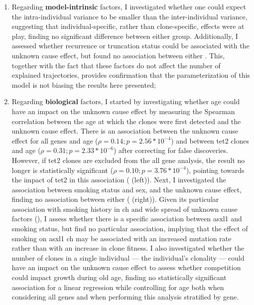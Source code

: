 \begin{enumerate}
    \item Regarding \textbf{model-intrinsic} factors, I investigated whether one could expect the intra-individual variance to be smaller than the inter-individual variance, suggesting that individual-specific, rather than clone-specific, effects were at play, finding no significant difference between either group. Additionally, I assessed whether recurrence or truncation status could be associated with the unknown cause effect, but found no association between either . This, together with the fact that these factors do not affect the number of explained trajectories, provides confirmation that the parameterization of this model is not biasing the results here presented;

    \item Regarding \textbf{biological} factors, I started by investigating whether age could have an impact on the unknown cause effect by measuring the Spearman correlation between the age at which the clones were first detected and the unknown cause effect. There is an association between the unknown cause effect for all genes and age ($\rho = 0.14; p = 2.56*10^{-4}$) and between \ac{tet2} clones and age ($\rho = 0.31; p = 2.33*10^{-6}$) after correcting for false discoveries. However, if \ac{tet2} clones are excluded from the all gene analysis, the result no longer is statistically significant ($\rho = 0.10; p = 3.76*10^{-4}$), pointing towards the impact of \ac{tet2} in this association ( (left)). Next, I investigated the association between smoking status and sex, and the unknown cause effect, finding no association between either ( (right)). Given its particular association with smoking history in \ac{ch} \cite{Dawoud2020-af} and wide spread of unknown cause factors (), I assess whether there is a specific association between \ac{asxl1} and smoking status, but find no particular association, implying that the effect of smoking on \ac{asxl1} \ac{ch} may be associated with an increased mutation rate rather than with an increase in clone fitness. I also investigated whether the number of clones in a single individual --- the individual's clonality --- could have an impact on the unknown cause effect to assess whether competition could impact growth during old age, finding no statistically significant association for a linear regression while controlling for age both when considering all genes and when performing this analysis stratified by gene.
\end{enumerate}

